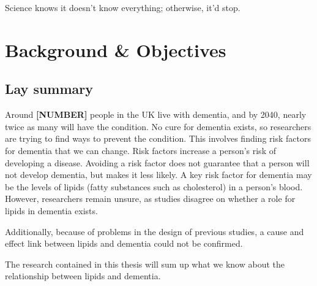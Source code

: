 \documentclass[a4paper,nobind]{templates/ociamthesis}
\begin{document}
\setlength{\textbaselineskip}{22pt plus2pt}

\setlength{\parskip}{2pt plus 1pt}

\setlength{\baselineskip}{\textbaselineskip}

\begin{savequote}
Science knows it doesn't know everything; otherwise, it'd stop.
\end{savequote}



\hypertarget{background-heading}{%
\chapter{Background \& Objectives}\label{background-heading}}

\minitoc 

\hypertarget{lay-summary}{%
\section{Lay summary}\label{lay-summary}}

Around \textbf{{[}NUMBER{]}} people in the UK live with dementia, and by 2040, nearly twice as many will have the condition. No cure for dementia exists, so researchers are trying to find ways to prevent the condition. This involves finding risk factors for dementia that we can change. Risk factors increase a person's risk of developing a disease. Avoiding a risk factor does not guarantee that a person will not develop dementia, but makes it less likely. A key risk factor for dementia may be the levels of lipids (fatty substances such as cholesterol) in a person's blood. However, researchers remain unsure, as studies disagree on whether a role for lipids in dementia exists.

Additionally, because of problems in the design of previous studies, a cause and effect link between lipids and dementia could not be confirmed.

The research contained in this thesis will sum up what we know about the relationship between lipids and dementia.
\end{document}
